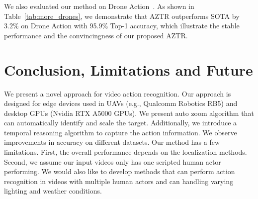 \documentclass[letterpaper, 10 pt, conference]{ieeeconf}
\begin{document}
We also evaluated our method on Drone Action~\cite{perera2019drone}. As shown in Table~\ref{tab:more_drones}, we demonstrate that AZTR outperforms SOTA by $3.2\%$ on Drone Action with 95.9\% Top-1 accuracy, which illustrate the stable performance and the convincingness of our proposed AZTR. 

 \section{Conclusion, Limitations and Future}
\label{sec: conclusion}

We present a novel approach for video action recognition. Our approach is designed for edge devices used in UAVs (e.g., Qualcomm Robotics RB5) and desktop GPUs (Nvidia RTX A5000 GPUs). We present auto zoom algorithm that can automatically identify and scale the target. Additionally, we introduce a temporal reasoning algorithm to capture the action information. We observe improvements in accuracy on different datasets. Our method has a few limitations. First, the overall performance depends on the localization methods. Second, we assume our input videos only has one scripted human actor performing. We would also like to develop methods that can perform action recognition in videos with multiple human actors and can handling varying lighting and weather conditions.\\
 



\end{document}
